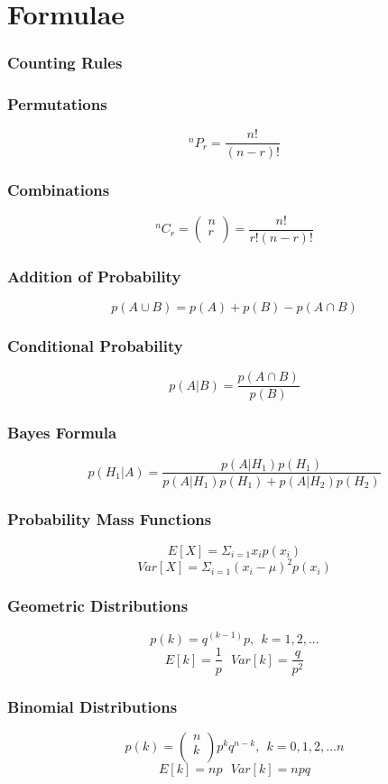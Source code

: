 \documentclass[a4paper,12pt]{article}
\theoremstyle{Qstyle}
\newcommand*{\Comb}[2]{{}^{#1}C_{#2}}%
\newcommand*{\Pick}[2]{{}^{#1}P_{#2}}%
\begin{document}
	
	\newpage
	
	\section*{Formulae}
	
	\subsubsection*{Counting Rules}
	\subsubsection*{Permutations }
	\[\Pick{n}{r}=\frac{n!}{(n-r)!}\] 
	\subsubsection*{Combinations}
	\[\Comb{n}{r}=\left( \begin{array}{c}
	n  \\
	r  \\
	\end{array} \right)=\frac{n!}{r!(n-r)!}\] 
	
	\subsubsection*{Addition of Probability}
	\[p(A\cup B)=p(A)+p(B)-p(A\cap B)\]
	\subsubsection*{Conditional Probability}
	\[p(A|B)=\frac{p(A \cap B)}{p(B)}\]
	\subsubsection*{Bayes Formula}
	\[p(H_1|A)=\frac{p(A|H_1)p(H_1)}{p(A|H_1)p(H_1)+p(A|H_2)p(H_2)}\]
	
	
	\subsubsection*{Probability Mass Functions}
	\[E[X]=\Sigma_{i=1} x_i p(x_i)\]
	\[Var[X]=\Sigma_{i=1} (x_i-\mu)^2 p(x_i)\]
	\subsubsection*{Geometric Distributions}
	\[p(k)=q^{(k-1)}p, \ \ k=1,2,... \]
	\[E[k]=\frac{1}{p} \ \ \ Var[k]=\frac{q}{p^2}\]
	
	\subsubsection*{Binomial Distributions}
	\[p(k)= \left( \begin{array}{c}
	n  \\
	k  \\
	\end{array} \right)p^kq^{n-k}, \ \ k=0,1,2,...n \]
	\[E[k]=np\ \ \ Var[k]=npq\]
	
\end{document}
